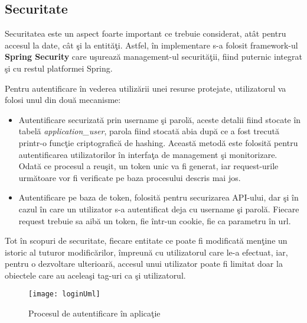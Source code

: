 \subsection{Securitate}
Securitatea este un aspect foarte important ce trebuie considerat, atât pentru accesul la date, cât şi la entităţi. Astfel, în implementare s-a folosit framework-ul \textbf{Spring Security} care uşurează management-ul securităţii, fiind puternic integrat şi cu restul platformei Spring.

Pentru autentificare în vederea utilizării unei resurse protejate, utilizatorul va folosi unul din două mecanisme:
\begin{itemize}
	\item Autentificare securizată prin username şi parolă, aceste detalii fiind stocate în tabelă \textit{application\_user}, parola fiind stocată abia după ce a fost trecută printr-o funcţie criptografică de hashing. Această metodă este folosită pentru autentificarea utilizatorilor în interfaţa de management şi monitorizare. Odată ce procesul a reuşit, un token unic va fi generat, iar request-urile următoare vor fi verificate pe baza procesului descris mai jos.
	\item Autentificare pe baza de token, folosită pentru securizarea API-ului, dar şi în cazul în care un utilizator s-a autentificat deja cu username şi parolă. Fiecare request trebuie sa aibă un token, fie într-un cookie, fie ca parametru în url.
\end{itemize}
Tot în scopuri de securitate, fiecare entitate ce poate fi modificată menţine un istoric al tuturor modificărilor, împreună cu utilizatorul care le-a efectuat, iar, pentru o dezvoltare ulterioară, accesul unui utilizator poate fi limitat doar la obiectele care au aceleaşi tag-uri ca şi utilizatorul.
\begin{landscape}
	\begin{figure}
		\centering
		\texttt{[image: loginUml]}
		\caption{Procesul de autentificare în aplicaţie}
		\label{fig:loginUml}
	\end{figure}
\end{landscape}



